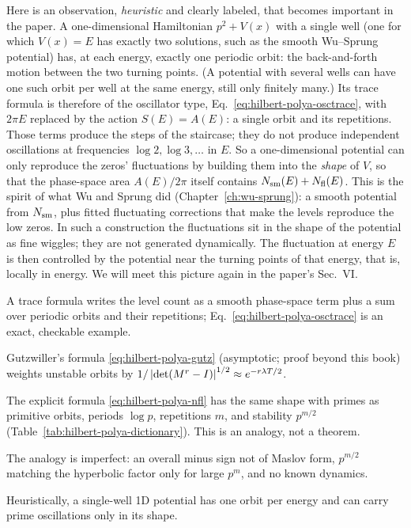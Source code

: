 Here is an observation, \emph{heuristic} and clearly labeled, that becomes important in the paper. A one-dimensional Hamiltonian $p^2+V(x)$ with a single well (one for which $V(x)=E$ has exactly two solutions, such as the smooth Wu--Sprung potential) has, at each energy, exactly one periodic orbit: the back-and-forth motion between the two turning points. (A potential with several wells can have one such orbit per well at the same energy, still only finitely many.) Its trace formula is therefore of the oscillator type, Eq.~\eqref{eq:hilbert-polya-osctrace}, with $2\pi E$ replaced by the action $S(E)=A(E)$: a single orbit and its repetitions. Those terms produce the steps of the staircase; they do not produce independent oscillations at frequencies $\log2,\log3,\dots$ in $E$. So a one-dimensional potential can only reproduce the zeros' fluctuations by building them into the \emph{shape} of $V$, so that the phase-space area $A(E)/2\pi$ itself contains $N_{\mathrm{sm}}(E)+N_{\mathrm{fl}}(E)$. This is the spirit of what Wu and Sprung did (Chapter~\ref{ch:wu-sprung}): a smooth potential from $N_{\mathrm{sm}}$, plus fitted fluctuating corrections that make the levels reproduce the low zeros. In such a construction the fluctuations sit in the shape of the potential as fine wiggles; they are not generated dynamically. The fluctuation at energy $E$ is then controlled by the potential near the turning points of that energy, that is, locally in energy. We will meet this picture again in the paper's Sec.~VI.

\begin{keyideas}
\item A trace formula writes the level count as a smooth phase-space term plus a sum over periodic orbits and their repetitions; Eq.~\eqref{eq:hilbert-polya-osctrace} is an exact, checkable example.
\item Gutzwiller's formula \eqref{eq:hilbert-polya-gutz} (asymptotic; proof beyond this book) weights unstable orbits by $1/\left\lvert \det(M^r-I)\right\rvert^{1/2}\approx e^{-r\lambda T/2}$.
\item The explicit formula \eqref{eq:hilbert-polya-nfl} has the same shape with primes as primitive orbits, periods $\log p$, repetitions $m$, and stability $p^{m/2}$ (Table~\ref{tab:hilbert-polya-dictionary}). This is an analogy, not a theorem.
\item The analogy is imperfect: an overall minus sign not of Maslov form, $p^{m/2}$ matching the hyperbolic factor only for large $p^m$, and no known dynamics.
\item Heuristically, a single-well 1D potential has one orbit per energy and can carry prime oscillations only in its shape.
\end{keyideas}

